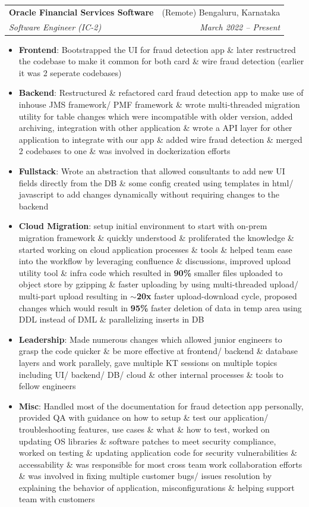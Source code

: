 \documentclass[letterpaper,11pt]{article}
\makeatletter
\newcommand{\resumeItem}[2]{
  \item\small{
    \textbf{#1}{: #2 \vspace{-2pt}}
  }
}
\newcommand{\resumeSubheading}[4]{
  \vspace{-1pt}\item
    \begin{tabular*}{0.97\textwidth}[t]{l@{\extracolsep{\fill}}r}
      \textbf{#1} & #2 \\
      \textit{\small#3} & \textit{\small #4} \\
    \end{tabular*}\vspace{-5pt}
}
\newcommand{\resumeItemListStart}{\begin{itemize}}
\newcommand{\resumeItemListEnd}{\end{itemize}\vspace{-5pt}}
\makeatother
\begin{document}
    \resumeSubheading
      {Oracle Financial Services Software}{(Remote) Bengaluru, Karnataka}
      {Software Engineer (IC-2)}{March 2022 -- Present}
      \resumeItemListStart
        \resumeItem{Frontend}
          {Bootstrapped the UI for fraud detection app \& later restructred the codebase to make it common for both card \& wire fraud detection (earlier it was 2 seperate codebases)}
        \resumeItem{Backend}
          {Restructured \& refactored card fraud detection app to make use of inhouse JMS framework/ PMF framework \& wrote multi-threaded migration utility for table changes which were incompatible with older version, added archiving, integration with other application \& wrote a API layer for other application to integrate with our app \& added wire fraud detection \& merged 2 codebases to one \& was involved in dockerization efforts}
        \resumeItem{Fullstack}
          {Wrote an abstraction that allowed consultants to add new UI fields directly from the DB \& some config created using templates in html/ javascript to add changes dynamically without requiring changes to the backend}
        \resumeItem{Cloud Migration}
          {setup initial environment to start with on-prem migration framework \& quickly understood \& proliferated the knowledge \& started working on cloud application processes \& tools \& helped team ease into the workflow by leveraging confluence \& discussions, improved upload utility tool \& infra code which resulted in \textbf{90\%} smaller files uploaded to object store by gzipping \& faster uploading by using multi-threaded upload/ multi-part upload resulting in $\sim$\textbf{20x} faster upload-download cycle, proposed changes which would result in \textbf{95\%} faster deletion of data in temp area using DDL instead of DML \& parallelizing inserts in DB}
        \resumeItem{Leadership}
          {Made numerous changes which allowed junior engineers to grasp the code quicker \& be more effective at frontend/ backend \& database layers and work parallely, gave multiple KT sessions on multiple topics including UI/ backend/ DB/ cloud \& other internal processes \& tools to fellow engineers}
        \resumeItem{Misc}
          {Handled most of the documentation for fraud detection app personally, provided QA with guidance on how to setup \& test our application/ troubleshooting features, use cases \& what \& how to test, worked on updating OS libraries \& software patches to meet security compliance, worked on testing \& updating application code for security vulnerabilities \& accessability \& was responsible for most cross team work collaboration efforts \& was involved in fixing multiple customer bugs/ issues resolution by explaining the behavior of application, misconfigurations \& helping support team with customers}
      \resumeItemListEnd
\end{document}
